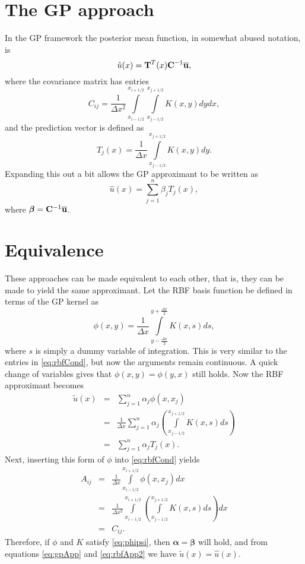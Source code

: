 \documentclass{article}
\providecommand{\mat}[1]{ {\rm\bf #1} }
\begin{document}
\section*{The GP approach}
In the GP framework the posterior mean function, in somewhat abused notation, is
\begin{equation}
  \hat{u}(x) = \mat{T}^T(x)\mat{C}^{-1}\overline{\mat{u}},
\end{equation}
where the covariance matrix has entries
\begin{equation}
  C_{ij} = \frac{1}{\Delta x^2}\int\limits_{x_{i-1/2}}^{x_{i+1/2}}\int\limits_{x_{j-1/2}}^{x_{j+1/2}} K(x,y) dydx,
\end{equation}
and the prediction vector is defined as
\begin{equation}
  T_j(x) = \frac{1}{\Delta x}\int\limits_{x_{j-1/2}}^{x_{j+1/2}} K(x,y)dy.
\end{equation}
Expanding this out a bit allows the GP approximant to be written as
\begin{equation}
  \hat{u}(x) = \sum\limits_{j=1}^n \beta_jT_j(x),
  \label{eq:gpApp}
\end{equation}
where $\bm{\beta} = \mat{C}^{-1}\overline{\mat{u}}$.

\section*{Equivalence}
These approaches can be made equivalent to each other, that is, they can be made to yield the same approximant. Let the RBF basis function be defined in terms of the GP kernel as
\begin{equation}
  \phi(x,y) = \frac{1}{\Delta x}\int\limits_{y-\frac{\Delta x}{2}}^{y+\frac{\Delta x}{2}} K(x,s) ds,
  \label{eq:phipsi}
\end{equation}
where $s$ is simply a dummy variable of integration. This is very similar to the entries in \eqref{eq:rbfCond}, but now the arguments remain continuous. A quick change of variables gives that $\phi(x,y)=\phi(y,x)$ still holds. Now the RBF approximant becomes
\begin{eqnarray}
  \widetilde{u}(x) &=& \sum\limits_{j=1}^n \alpha_j\phi(x,x_j) \\
  &=& \frac{1}{\Delta x}\sum\limits_{j=1}^n \alpha_j\left(\int\limits_{x_{j-1/2}}^{x_{j+1/2}} K(x,s) ds\right) \\
  &=& \sum\limits_{j=1}^n \alpha_jT_j(x).
  \label{eq:rbfApp2}
\end{eqnarray}
Next, inserting this form of $\phi$ into \eqref{eq:rbfCond} yields
\begin{eqnarray}
  A_{ij} &=& \frac{1}{\Delta x}\int\limits_{x_{i-1/2}}^{x_{i+1/2}} \phi(x,x_j)dx \\
  &=& \frac{1}{\Delta x^2}\int\limits_{x_{i-1/2}}^{x_{i+1/2}} \left(\int\limits_{x_{j-1/2}}^{x_{j+1/2}} K(x,s) ds\right) dx \\
  &=& C_{ij}.
\end{eqnarray}
Therefore, if $\phi$ and $K$ satisfy \eqref{eq:phipsi}, then $\bm{\alpha}=\bm{\beta}$ will hold, and from equations \eqref{eq:gpApp} and \eqref{eq:rbfApp2} we have $\widetilde{u}(x) = \hat{u}(x)$.
\end{document}
